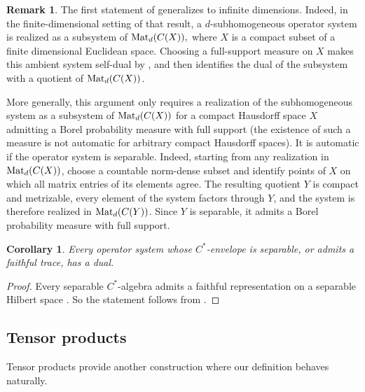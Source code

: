 \documentclass[11pt,onecolumn]{article}
\theoremstyle{plain}
\newtheorem{corollary}[corollary]{Corollary}
\theoremstyle{definition}
\newtheorem{remark}[remark]{Remark}
\begin{document}
\begin{remark}
    The first statement of  generalizes
    \cite[Theorem~5.1]{DannemuellerNetzer2026Subhomogeneous} to infinite
    dimensions. Indeed, in the finite-dimensional setting of that result, a
    $d$-subhomogeneous operator system is realized as a subsystem of
    ${\rm Mat}_d(C(X)),$ where $X$ is a compact subset of a finite dimensional Euclidean space. Choosing a full-support measure on $X$ makes this
    ambient system self-dual by , and  then
    identifies the dual of the subsystem with a quotient of ${\rm Mat}_d(C(X))$.
    
    More generally, this argument only requires a realization of the
    subhomogeneous system as a subsystem of ${\rm Mat}_d(C(X))$ for a compact
    Hausdorff space $X$ admitting a Borel probability measure with full
    support (the existence of such a measure is not automatic for arbitrary
    compact Hausdorff spaces).  It is automatic if the operator system is
    separable.  Indeed, starting from any realization in ${\rm Mat}_d(C(X))$,
    choose a countable norm-dense subset and identify points of $X$ on which
    all matrix entries of its elements agree.  The resulting quotient $Y$ is
    compact and metrizable, every element of the system factors through $Y$,
    and the system is therefore realized in ${\rm Mat}_d(C(Y))$.  Since $Y$
    is separable, it admits a Borel probability measure with full support.
\end{remark}

\begin{corollary}
    Every operator system whose $C^*$-envelope is separable, or admits a
    faithful trace, has a dual.
\end{corollary}

\begin{proof}
    Every separable $C^*$-algebra admits a faithful representation on a separable Hilbert space \cite[Theorem~7.10]{Conway2000}. So the statement follows from 
    .
\end{proof}

\subsection{Tensor products}

Tensor products provide another construction where our  definition behaves
naturally. 
\end{document}
